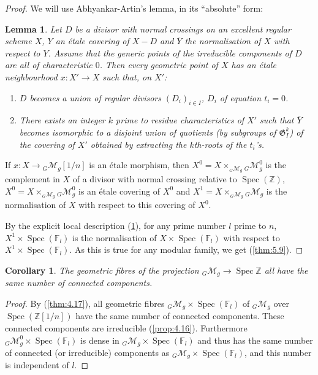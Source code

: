 \documentclass[10pt]{amsart}
\theoremstyle{plain}
\newtheorem{lemma}[theorem]{Lemma}
\newtheorem{corollary}[theorem]{Corollary}
\theoremstyle{definition}
\DeclareMathOperator{\Spec}{Spec}
\begin{document}
\begin{proof}
We will use Abhyankar-Artin's lemma, in its ``absolute'' form:

\begin{lemma}\label{lem:5.10}
Let $D$ be a divisor with normal crossings on an excellent regular scheme $X$, $Y$ an \'etale covering of $X - D$ and $\overline{Y}$ the normalisation of $X$ with respect to $Y$. Assume that the generic points of the irreducible components of $D$ are all of characteristic $0$. Then every geometric point of $X$ has an \'etale neighbourhood $x: X' \to X$ such that, on $X'$:
\begin{enumerate}
\item[(i)] $D$ becomes a union of regular divisors $(D_i)_{i \in I}$, $D_i$ of equation $t_i = 0$.
\item[(ii)] There exists an integer $k$ prime to residue characteristics of $X'$ such that $\overline{Y}$ becomes isomorphic to a disjoint union of quotients (by subgroups of $\mathfrak{G}_I^k$) of the covering of $X'$ obtained by extracting the $k$th-roots of the $t_i$'s.
\end{enumerate}
\end{lemma}

If $x: X \to {_G\mathscr{M}_g}[1/n]$ is an \'etale morphism, then $X^0 = X \times_{_G\mathscr{M}_g} {_G\mathscr{M}_g^0}$ is the complement in $X$ of a divisor with normal crossing relative to $\Spec(\mathbb{Z})$, $X^0 = X \times_{_G\mathscr{M}_g} {_G\mathscr{M}_g^0}$ is an \'etale covering of $X^0$ and $X^1 = X \times_{_G\mathscr{M}_g} {_G\mathscr{M}_g}$ is the normalisation of $X$ with respect to this covering of $X^0$.

By the explicit local description (\ref{lem:5.10}), for any prime number $l$ prime to $n$, $X^1 \times \Spec(\mathbb{F}_l)$ is the normalisation of $X \times \Spec(\mathbb{F}_l)$ with respect to $X^1 \times \Spec(\mathbb{F}_l)$. As this is true for any modular family, we get (\ref{thm:5.9}).
\end{proof}

\begin{corollary}\label{cor:5.11}
The geometric fibres of the projection $_G\mathscr{M}_g \to \Spec \mathbb{Z}$ all have the same number of connected components.
\end{corollary}

\begin{proof}
By (\ref{thm:4.17}), all geometric fibres $_G\mathscr{M}_g \times \Spec(\mathbb{F}_l)$ of $_G\mathscr{M}_g$ over $\Spec(\mathbb{Z}[1/n])$ have the same number of connected components. These connected components are irreducible (\ref{prop:4.16}). Furthermore $_G\mathscr{M}_g^0 \times \Spec(\mathbb{F}_l)$ is dense in $_G\mathscr{M}_g \times \Spec(\mathbb{F}_l)$ and thus has the same number of connected (or irreducible) components as $_G\mathscr{M}_g \times \Spec(\mathbb{F}_l)$, and this number is independent of $l$.
\end{proof}
\end{document}

